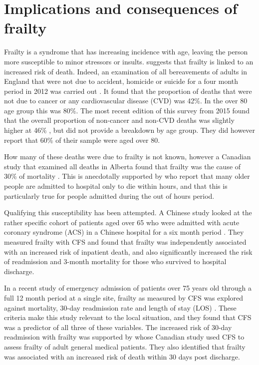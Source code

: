 \documentclass
[
	12pt,
	a4paper,
	oneside,
]{report}
\begin{document}
\section{Implications and consequences of frailty}

\label{sec:frailty-implications}
Frailty is a syndrome that has increasing incidence with age, leaving the person
more susceptible to minor stressors or insults. \textcite{collard:12} suggests
that frailty is linked to an increased risk of death. Indeed,
an examination
of all bereavements of adults in England that were not due to accident, homicide or suicide for 
a four month period in 2012 was 
carried out \parencite{ons:13}. It found that the proportion of deaths
that were not due to cancer or any cardiovascular disease (CVD) was 42\%. 
In the over 80
age group this was 80\%. The most recent edition of this survey from 2015 found
that the overall proportion of non-cancer and non-CVD deaths was slightly higher 
at 46\% \parencite{ons:16}, but did not provide a breakdown by age group. They 
did however report that 60\% of their sample were aged over 80.

How many of these deaths were due to frailty is not known, however 
a Canadian study that examined all deaths in Alberta found that frailty was the
cause of 30\% of mortality \parencite{fassbender:09}. This is anecdotally
supported by \textcite{silver:12} who report that many older people are admitted 
to hospital only to die within hours, and that
this is particularly true for people admitted during the out of hours period.

Qualifying this susceptibility
has been attempted. 
A Chinese study looked at the rather specific cohort of patients aged over 65
who were admitted with acute coronary syndrome (ACS) in a Chinese hospital for 
a six month period \parencite{kang:15}. They measured frailty with CFS and 
found that frailty was independently associated with an increased risk of 
inpatient death, and also significantly increased the risk of readmission and 
3-month mortality for those who survived to hospital discharge.

In a recent study of emergency admission of patients over 
75 years old through a full 12 month period at a single site, frailty as
measured by CFS was explored against mortality, 30-day readmission rate and 
length of stay (LOS)
\parencite{wallis:15}.
These criteria make this study relevant to the local situation, and they found 
that CFS was a predictor of all three of these variables. The increased risk of
30-day readmission with frailty was supported by \textcite{kahlon:15} whose 
Canadian study used CFS to assess frailty of adult general medical patients. 
They also identified that frailty was associated with an increased risk of death
within 30 days post discharge.
\end{document}
